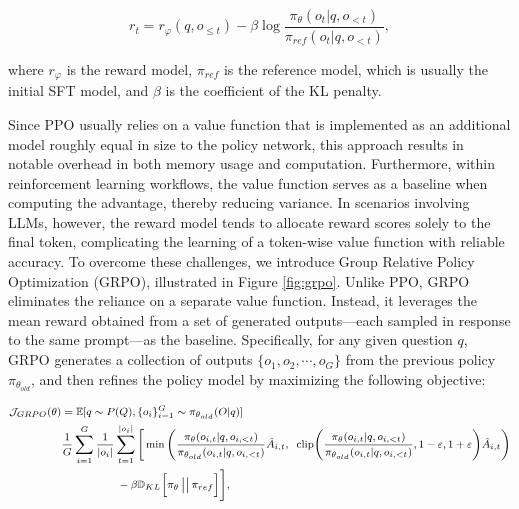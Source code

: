 \begin{itemize}[topsep=0pt]
\begin{itemize}[topsep=0pt]
\begin{equation}
    r_{t} = r_\varphi(q, o_{\le t}) - \beta \log\frac{\pi_{\theta}(o_{t}|q, o_{<t})}{\pi_{ref}(o_{t}|q, o_{<t})},
\label{eq:PPO-reward}
\end{equation}

where $r_\varphi$  is the reward model, $\pi_{ref}$ is the reference model, which is usually the initial SFT model, and $\beta$  is the coefficient of the KL penalty.

Since PPO usually relies on a value function that is implemented as an additional model roughly equal in size to the policy network, this approach results in notable overhead in both memory usage and computation. Furthermore, within reinforcement learning workflows, the value function serves as a baseline when computing the advantage, thereby reducing variance. In scenarios involving LLMs, however, the reward model tends to allocate reward scores solely to the final token, complicating the learning of a token-wise value function with reliable accuracy. To overcome these challenges, we introduce Group Relative Policy Optimization (GRPO), illustrated in Figure \ref{fig:grpo}. Unlike PPO, GRPO eliminates the reliance on a separate value function. Instead, it leverages the mean reward obtained from a set of generated outputs—each sampled in response to the same prompt—as the baseline. Specifically, for any given question $q$, GRPO generates a collection of outputs $\{o_1, o_2, \cdots, o_G\}$ from the previous policy $\pi_{\theta_{old}}$, and then refines the policy model by maximizing the following objective:

\begin{equation}
\footnotesize
\begin{split}
    \mathcal{J}_{GRPO}(\theta) &= \mathbb{E}{[q \sim P(Q), \{o_i\}_{i=1}^G \sim \pi_{\theta_{old}}(O|q)]}  \\
    & \frac{1}{G}\sum_{i=1}^G\frac{1}{|o_i|} \sum_{t=1}^{|o_i|} \Bigg[ \min \Bigg( \frac{\pi_\theta(o_{i,t} | q, o_{i,<t})}{\pi_{\theta_{old}}(o_{i,t} | q, o_{i,<t})} \hat{A}_{i,t}, \;\; \text{clip} \Bigg( \frac{\pi_\theta(o_{i,t} | q, o_{i,<t})}{\pi_{\theta_{old}}(o_{i,t} | q, o_{i,<t})}, 1 - \varepsilon, 1 + \varepsilon \Bigg) \hat{A}_{i,t} \Bigg) \\ 
    & \hspace{1.5cm} - \beta \mathbb{D}_{KL}\bigg[\pi_{\theta} \,\big|\big|\, \pi_{ref}\bigg] \Bigg],
\end{split}
\label{eq:GRPO-obj}
\end{equation}


\end{itemize}
\end{itemize}
